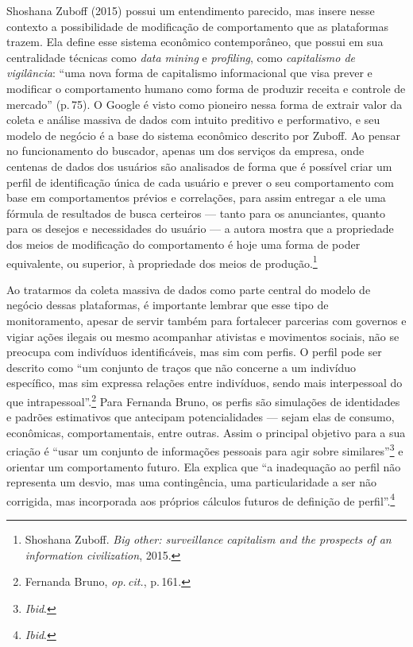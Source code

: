 Shoshana Zuboff (2015) possui um entendimento parecido, mas insere nesse
contexto a possibilidade de modificação de comportamento que as
plataformas trazem. Ela define esse sistema econômico contemporâneo, que
possui em sua centralidade técnicas como \emph{data mining} e
\emph{profiling}, como \textit{capitalismo de vigilância}: ``uma nova forma de
capitalismo informacional que visa prever e modificar o comportamento
humano como forma de produzir receita e controle de mercado'' (p.\,75). O
Google é visto como pioneiro nessa forma de extrair valor da coleta e
análise massiva de dados com intuito preditivo e performativo, e seu
modelo de negócio é a base do sistema econômico descrito por Zuboff. Ao
pensar no funcionamento do buscador, apenas um dos serviços da empresa,
onde centenas de dados dos usuários são analisados de forma que é
possível criar um perfil de identificação única de cada usuário e prever
o seu comportamento com base em comportamentos prévios e correlações,
para assim entregar a ele uma fórmula de resultados de busca certeiros
--- tanto para os anunciantes, quanto para os desejos e necessidades do
usuário --- a autora mostra que a propriedade dos meios de modificação do
comportamento é hoje uma forma de poder equivalente, ou superior, à
propriedade dos meios de produção.\footnote{Shoshana Zuboff. \emph{Big other: surveillance capitalism and the
prospects of an information civilization}, 2015.}

Ao tratarmos da coleta massiva de dados como parte central do modelo de
negócio dessas plataformas, é importante lembrar que esse tipo de
monitoramento, apesar de servir também para fortalecer parcerias com
governos e vigiar ações ilegais ou mesmo acompanhar ativistas e
movimentos sociais, não se preocupa com indivíduos identificáveis, mas
sim com perfis. O perfil pode ser descrito como ``um conjunto de traços
que não concerne a um indivíduo específico, mas sim expressa relações
entre indivíduos, sendo mais interpessoal do que intrapessoal''.\footnote{Fernanda Bruno, \textit{op.\,cit.}, p.\,161.} Para Fernanda Bruno, os perfis são simulações de identidades e
padrões estimativos que antecipam potencialidades ­--- sejam elas de
consumo, econômicas, comportamentais, entre outras. Assim o principal
objetivo para a sua criação é ``usar um conjunto de informações pessoais
para agir sobre similares''\footnote{\textit{Ibid}.} e orientar um comportamento futuro.
Ela explica que ``a inadequação ao perfil não representa um desvio, mas
uma contingência, uma particularidade a ser não corrigida, mas
incorporada aos próprios cálculos futuros de definição de
perfil''.\footnote{\textit{Ibid}.}


